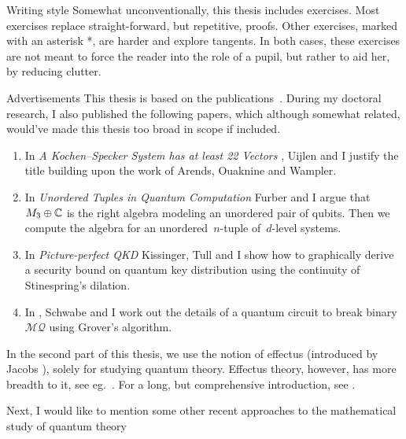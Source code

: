 \documentclass[b]{subfiles}
\begin{document}
\begin{parsec}
\begin{point}{Writing style}
Somewhat unconventionally, this thesis includes exercises.
Most exercises replace straight-forward, but repetitive, proofs.
Other exercises, marked with an asterisk *,
    are harder and explore tangents.
In both cases, these exercises are not meant to force the reader into the
    role of a pupil, but rather to aid her, by reducing clutter.
\end{point}
\begin{point}{Advertisements}%
This thesis is based on the publications~\cite{wwpaschke,westerbaan2016universal,cho2015quotient,statesofconvexsets}.
During my doctoral research,
    I also published the following papers,
    which although somewhat related,
    would've made this thesis too broad in scope if included.
\begin{enumerate}
    \item In \emph{A Kochen--Specker System has at least 22 Vectors} \cite{uijlen2016kochen},
        Uijlen and I justify the title building upon the work
        of Arends, Ouaknine and Wampler.
\item 
    In \emph{Unordered Tuples in Quantum Computation} \cite{bags}
        Furber and I argue that~$M_3 \oplus \mathbb{C}$ is the right algebra
        modeling an unordered pair of qubits.  Then we compute
        the algebra for an unordered~$n$-tuple of~$d$-level systems.
\item
    In \emph{Picture-perfect QKD} \cite{kissinger2017picture}
        Kissinger, Tull and I show how to graphically derive a security
        bound on quantum key distribution using the continuity of Stinespring's dilation.
\item
    In \cite{schwabe2016solving}, Schwabe and I
            work out the details of a quantum circuit
            to break binary~$\mathcal{MQ}$ using Grover's algorithm.
\end{enumerate}
In the second part of this thesis,
    we use the notion of effectus (introduced by Jacobs \cite{newdirections}),
    solely for studying quantum theory.
Effectus theory, however, has more breadth to it,
 see eg.~\cite{jacobs2017quantum,
cho2017disintegration,
adams2015type,
jacobs2016hyper,
jacobs2017channel,
jacobs2017formal,
cho2017efprob,
jacobs2017probability,
jacobs2017recipe,
jacobs2016effectuses,
jacobs2016affine,
jacobs2017distances,
jacobs2015effect}.
For a long, but comprehensive introduction, see \cite{effintro}.
\begin{point}%
Next, I would like to mention some other recent approaches
    to the mathematical study of quantum theory

\end{point}
\end{point}
\end{parsec}
\end{document}

